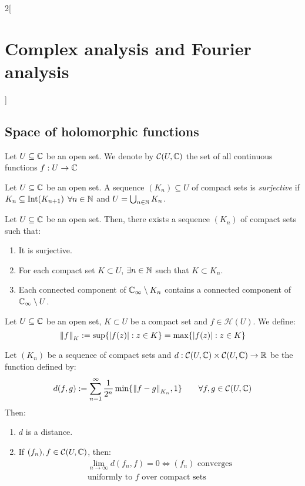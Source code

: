 \documentclass[../../../main.tex]{subfiles}
\begin{document}
\begin{multicols}{2}[\section{Complex analysis and Fourier analysis}]
  \subsection{Space of holomorphic functions}
  \begin{definition}
    Let $U\subseteq\mathbb{C}$ be an open set. We denote by $\mathcal{C}(U,\mathbb{C})$ the set of all continuous functions $f:U\rightarrow\mathbb{C}$
  \end{definition}
  \begin{definition}
    Let $U\subseteq\mathbb{C}$ be an open set. A sequence $(K_n)\subseteq U$ of compact sets is \emph{surjective} if $K_n\subseteq \operatorname{Int}(K_{n+1})$ $\forall n\in\mathbb{N}$ and $U=\bigcup_{n\in\mathbb{N}}K_n$.
  \end{definition}
  \begin{proposition}
    Let $U\subseteq\mathbb{C}$ be an open set. Then, there exists a sequence $(K_n)$ of compact sets such that:
    \begin{enumerate}
      \item It is surjective.
      \item For each compact set $K\subset U$, $\exists n\in\mathbb{N}$ such that $K\subset K_n$.
      \item Each connected component of $\mathbb{C}_\infty\setminus K_n$ contains a connected component of $\mathbb{C}_\infty\setminus U$.
    \end{enumerate}
  \end{proposition}
  \begin{definition}
    Let $U\subseteq\mathbb{C}$ be an open set, $K\subset U$ be a compact set and $f\in\mathcal{H}(U)$. We define: $${\|f\|}_K:=\sup\{\abs{f(z)}:z\in K\}=\max\{\abs{f(z)}:z\in K\}$$
  \end{definition}
  \begin{theorem}
    Let $(K_n)$ be a sequence of compact sets and $d:\mathcal{C}(U,\mathbb{C})\times\mathcal{C}(U,\mathbb{C})\rightarrow\mathbb{R}$ be the function defined by:
    $$d(f,g):=\sum_{n=1}^\infty\frac{1}{2^n}\min\{{\|f-g\|}_{K_n},1\}\qquad\forall f,g\in\mathcal{C}(U,\mathbb{C})$$ Then:
    \begin{enumerate}
      \item $d$ is a distance.
      \item If $(f_n),f\in\mathcal{C}(U,\mathbb{C})$, then:
            \begin{multline*}
              \lim_{n\to\infty}d(f_n,f)= 0\iff (f_n)\text{ converges}\\ \text{uniformly to }f\text{ over compact sets}
            \end{multline*}

\end{enumerate}
\end{theorem}
\end{multicols}
\end{document}
